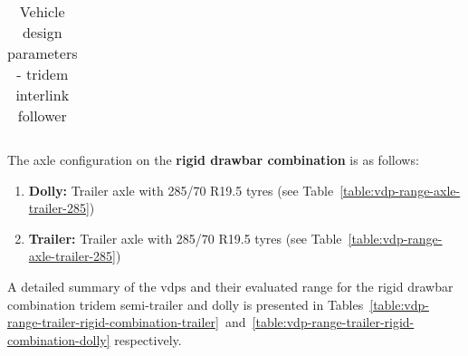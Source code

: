 \begin{table}[H]
\begin{threeparttable}
\begin{tabulary}{\textwidth}{lcccccc}
			\bottomrule
		\end{tabulary}

		\caption{Vehicle design parameters - tridem interlink follower}
		\label{table:vdp-range-trailer-tridem-interlink-follower}


	\end{threeparttable}
\end{table}
\newpage
The axle configuration on the \textbf{rigid drawbar combination} is as follows:

\begin{enumerate}
	\item \textbf{Dolly:} Trailer axle with 285/70 R19.5 tyres (see Table~\ref{table:vdp-range-axle-trailer-285})
	\item \textbf{Trailer:} Trailer axle with 285/70 R19.5 tyres (see Table~\ref{table:vdp-range-axle-trailer-285})
\end{enumerate}

A detailed summary of the \glspl{vdp} and their evaluated range for the rigid drawbar combination tridem semi-trailer and dolly is presented in Tables~\ref{table:vdp-range-trailer-rigid-combination-trailer}~and~\ref{table:vdp-range-trailer-rigid-combination-dolly} respectively.


